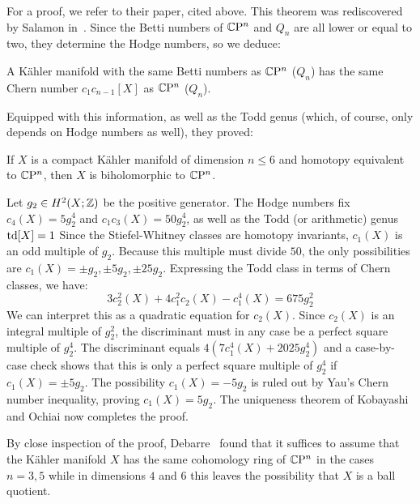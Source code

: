 For a proof, we refer to their paper, cited above. This theorem was rediscovered by Salamon in~\cite{Sal1996}. Since the Betti numbers of $\mathbb{C}\mathrm{P}^n$ and $Q_n$ are all lower or equal to two, they determine the Hodge numbers, so we deduce:

\begin{cor}
	A K\"ahler manifold with the same Betti numbers as $\mathbb{C}\mathrm{P}^n$ ($Q_n$) has the same Chern number $c_1c_{n-1}[X]$ as $\mathbb{C}\mathrm{P}^n$ ($Q_n$).
\end{cor}

Equipped with this information, as well as the Todd genus (which, of course, only depends on Hodge numbers as well), they proved:

\begin{prop}
	If $X$ is a compact K\"ahler manifold of dimension $n\leq 6$ and homotopy equivalent to $\mathbb{C}\mathrm{P}^n$, then $X$ is biholomorphic to $\mathbb{C}\mathrm{P}^n$.
\end{prop}
\begin{myproof}[Proof for $n=4$]
	Let $g_2\in H^2(X;\mathbb{Z})$ be the positive generator. The Hodge numbers fix $c_4(X)=5g_2^4$ and $c_1c_3(X)=50g_2^4$, as well as the Todd (or arithmetic) genus $\operatorname{td}[X]=1$ Since the Stiefel-Whitney classes are homotopy invariants, $c_1(X)$ is an odd multiple of $g_2$. Because this multiple must divide $50$, the only possibilities are $c_1(X)=\pm g_2, \pm 5g_2, \pm 25g_2$. Expressing the Todd class in terms of Chern classes, we have:
	\begin{equation*}
	3c_2^2(X)+4c_1^2c_2(X)-c_1^4(X)=675g_2^2
	\end{equation*}
	We can interpret this as a quadratic equation for $c_2(X)$. Since $c_2(X)$ is an integral multiple of $g_2^2$, the discriminant must in any case be a perfect square multiple of $g_2^4$. The discriminant equals $4(7c_1^4(X)+2025g_2^4)$ and a case-by-case check shows that this is only a perfect square multiple of $g_2^4$ if $c_1(X)=\pm 5 g_2$. The possibility $c_1(X)=-5g_2$ is ruled out by Yau's Chern number inequality, proving $c_1(X)=5g_2$. The uniqueness theorem of Kobayashi and Ochiai now completes the proof.
\end{myproof}

\begin{rem}
	By close inspection of the proof, Debarre~\cite{Deb2015} found that it suffices to assume that the K\"ahler manifold $X$ has the same cohomology ring of $\mathbb{C}\mathrm{P}^n$ in the cases $n=3,5$ while in dimensions $4$ and $6$ this leaves the possibility that $X$ is a ball quotient.
\end{rem}

